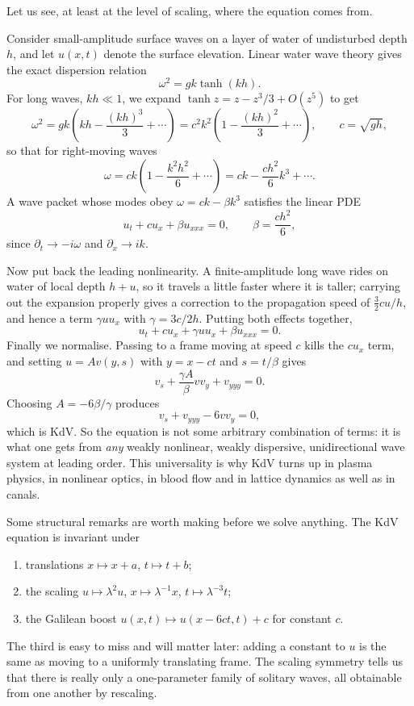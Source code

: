 Let us see, at least at the level of scaling, where the equation comes from.

\begin{example}
	Consider small-amplitude surface waves on a layer of water of undisturbed depth $h$, and let $u(x,t)$ denote the surface elevation. Linear water wave theory gives the exact dispersion relation
	$$
	\omega^2 = gk\tanh(kh).
	$$
	For long waves, $kh \ll 1$, we expand $\tanh z = z - z^3/3 + O(z^5)$ to get
	$$
	\omega^2 = gk\left(kh - \frac{(kh)^3}{3} + \cdots\right) = c^2k^2\left(1 - \frac{(kh)^2}{3}+\cdots\right), \qquad c = \sqrt{gh},
	$$
	so that for right-moving waves
	$$
	\omega = ck\left(1 - \frac{k^2h^2}{6} + \cdots\right) = ck - \frac{ch^2}{6}k^3 + \cdots.
	$$
	A wave packet whose modes obey $\omega = ck - \beta k^3$ satisfies the linear PDE
	$$
	u_t + cu_x + \beta u_{xxx} = 0, \qquad \beta = \frac{ch^2}{6},
	$$
	since $\partial_t \to -i\omega$ and $\partial_x\to ik$.

	Now put back the leading nonlinearity. A finite-amplitude long wave rides on water of local depth $h + u$, so it travels a little faster where it is taller; carrying out the expansion properly gives a correction to the propagation speed of $\tfrac{3}{2}cu/h$, and hence a term $\gamma u u_x$ with $\gamma = 3c/2h$. Putting both effects together,
	$$
	u_t + cu_x + \gamma uu_x + \beta u_{xxx} = 0.
	$$
	Finally we normalise. Passing to a frame moving at speed $c$ kills the $cu_x$ term, and setting $u = Av(y, s)$ with $y = x - ct$ and $s = t/\beta$ gives
	$$
	v_s + \frac{\gamma A}{\beta}vv_y + v_{yyy} = 0.
	$$
	Choosing $A = -6\beta/\gamma$ produces
	$$
	v_s + v_{yyy} - 6vv_y = 0,
	$$
	which is KdV. So the equation is not some arbitrary combination of terms: it is what one gets from \emph{any} weakly nonlinear, weakly dispersive, unidirectional wave system at leading order. This universality is why KdV turns up in plasma physics, in nonlinear optics, in blood flow and in lattice dynamics as well as in canals.
\end{example}

Some structural remarks are worth making before we solve anything. The KdV equation is invariant under
\begin{enumerate}[label=(\roman*)]
	\item translations $x\mapsto x + a$, $t\mapsto t+b$;
	\item the scaling $u \mapsto \lambda^2 u$, $x\mapsto \lambda^{-1}x$, $t\mapsto \lambda^{-3}t$;
	\item the Galilean boost $u(x,t)\mapsto u(x - 6ct, t) + c$ for constant $c$.
\end{enumerate}
The third is easy to miss and will matter later: adding a constant to $u$ is the same as moving to a uniformly translating frame. The scaling symmetry tells us that there is really only a one-parameter family of solitary waves, all obtainable from one another by rescaling.

